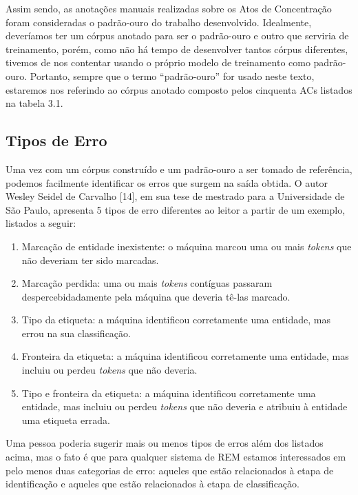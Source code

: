 \documentclass[11pt]{report}
\newcommand{\quotes}[1]{``#1''}
\begin{document}
Assim sendo, as anotações manuais realizadas sobre os Atos de Concentração foram consideradas o padrão-ouro do trabalho desenvolvido. Idealmente,
deveríamos ter um córpus anotado para ser o padrão-ouro e outro que serviria de treinamento, porém, como não há tempo de desenvolver tantos córpus diferentes, tivemos de nos
contentar usando o próprio modelo de treinamento como padrão-ouro. Portanto, sempre que o termo \quotes{padrão-ouro} for usado neste texto, estaremos nos referindo ao córpus
anotado composto pelos cinquenta ACs listados na tabela 3.1.

\subsection{Tipos de Erro}

\indent\indent Uma vez com um córpus construído e um padrão-ouro a ser tomado de referência, podemos facilmente identificar os erros que surgem na saída obtida. O autor
Wesley Seidel de Carvalho [14], em sua tese de mestrado para a Universidade de São Paulo, apresenta 5 tipos de erro diferentes ao leitor a partir de um exemplo, listados a seguir:

\begin{enumerate}[label=\textbf{E\arabic*.}]
  \item Marcação de entidade inexistente: o máquina marcou uma ou mais \textit{tokens} que não deveriam ter sido marcadas.
  \item Marcação perdida: uma ou mais \textit{tokens} contíguas passaram despercebidadamente pela máquina que deveria tê-las marcado.
  \item Tipo da etiqueta: a máquina identificou corretamente uma entidade, mas errou na sua classificação.
  \item Fronteira da etiqueta: a máquina identificou corretamente uma entidade, mas incluiu ou perdeu \textit{tokens} que não deveria.
  \item Tipo e fronteira da etiqueta: a máquina identificou corretamente uma entidade, mas incluiu ou perdeu \textit{tokens} que não deveria e atribuiu à entidade uma etiqueta errada.
\end{enumerate}

Uma pessoa poderia sugerir mais ou menos tipos de erros além
dos listados acima, mas o fato é que para qualquer sistema de REM estamos interessados em pelo menos duas categorias de erro: aqueles que estão relacionados à etapa de identificação
e aqueles que estão relacionados à etapa de classificação.
\end{document}

